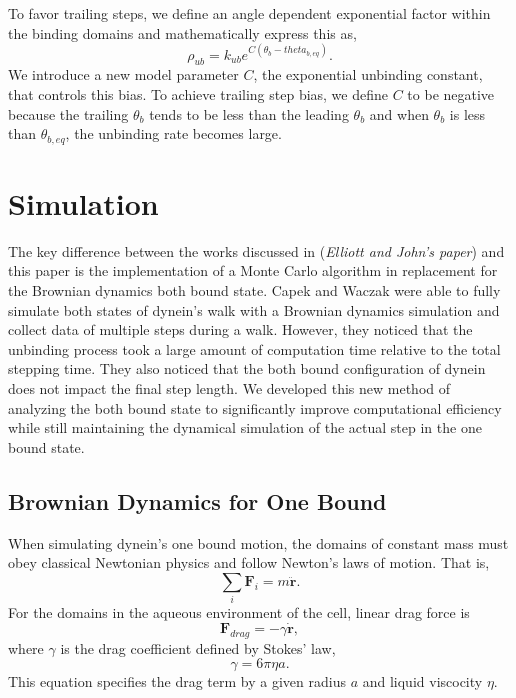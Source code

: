 To favor trailing steps, we define an angle dependent exponential factor within the binding domains and mathematically express this as,
\begin{equation}
	\rho_{ub}=k_{ub}e^{C(\theta_b-theta_{b,eq})}.
\end{equation}
We introduce a new model parameter $C$, the exponential unbinding constant, that controls this bias. To achieve trailing step bias, we define $C$ to be negative because the trailing $\theta_b$ tends to be less than the leading $\theta_b$ and  when $\theta_b$ is less than $\theta_{b,eq}$, the unbinding rate becomes large.


\section{Simulation}

The key difference between the works discussed in \cite{Capek2017, } (\textit{Elliott and John's paper}) and this paper is the implementation of a Monte Carlo algorithm in replacement for the Brownian dynamics both bound state. Capek and Waczak were able to fully simulate both states of dynein's walk with a Brownian dynamics simulation and collect data of multiple steps during a walk. However, they noticed that the unbinding process took a large amount of computation time relative to the total stepping time. They also noticed that the both bound configuration of dynein does not impact the final step length. We developed this new method of analyzing the both bound state to significantly improve computational efficiency while still maintaining the dynamical simulation of the actual step in the one bound state. 



\subsection{Brownian Dynamics for One Bound}
\label{sec:BrownianDynamics}

When simulating dynein's one bound motion, the domains of constant mass must obey classical Newtonian physics and follow Newton's laws of motion. That is,
\begin{equation}
	\sum_{i}\textbf{F}_i=m\ddot{\textbf{r}}.
\end{equation} 
For the domains in the aqueous environment of the cell, linear drag force is
\begin{equation}
	\textbf{F}_{drag}=-\gamma \dot{\textbf{r}},
\end{equation}
where $\gamma$ is the drag coefficient defined by Stokes' law,
\begin{equation}
	\gamma=6\pi\eta a.
\end{equation}
This equation specifies the drag term by a given radius $a$ and liquid viscocity $\eta$. 

